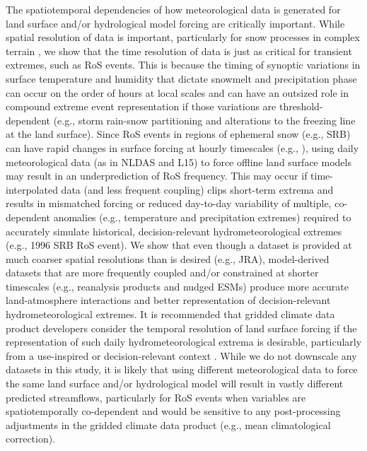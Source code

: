 \documentclass[draft]{agujournal2019}
\begin{document}
The spatiotemporal dependencies of how meteorological data is generated for land surface and/or hydrological model forcing are critically important. 
While spatial resolution of data is important, particularly for snow processes in complex terrain \citep{henn2018an,Woodburn2021}, we show that the time resolution of data is just as critical for transient extremes, such as RoS events.
This is because the timing of synoptic variations in surface temperature and humidity that dictate snowmelt and precipitation phase can occur on the order of hours at local scales and can have an outsized role in compound extreme event representation if those variations are threshold-dependent (e.g., storm rain-snow partitioning and alterations to the freezing line at the land surface).
Since RoS events in regions of ephemeral snow (e.g., SRB) can have rapid changes in surface forcing at hourly timescales (e.g., \citet{leathers1998severe}), using daily meteorological data (as in NLDAS and L15) to force offline land surface models may result in an underprediction of RoS frequency. 
This may occur if time-interpolated data (and less frequent coupling) clips short-term extrema and results in mismatched forcing or reduced day-to-day variability of multiple, co-dependent anomalies (e.g., temperature and precipitation extremes) required to accurately simulate historical, decision-relevant hydrometeorological extremes (e.g., 1996 SRB RoS event). 
We show that even though a dataset is provided at much coarser spatial resolutions than is desired (e.g., JRA), model-derived datasets that are more frequently coupled and/or constrained at shorter timescales (e.g., reanalysis products and nudged ESMs) produce more accurate land-atmosphere interactions and better representation of decision-relevant hydrometeorological extremes. 
It is recommended that gridded climate data product developers consider the temporal resolution of land surface forcing if the representation of such daily hydrometeorological extrema is desirable, particularly from a use-inspired or decision-relevant context \citep{Jagannathan2021}.
While we do not downscale any datasets in this study, it is likely that using different meteorological data to force the same land surface and/or hydrological model will result in vastly different predicted streamflows, particularly for RoS events when variables are spatiotemporally co-dependent and would be sensitive to any post-processing adjustments in the gridded climate data product (e.g., mean climatological correction). 
\end{document}
